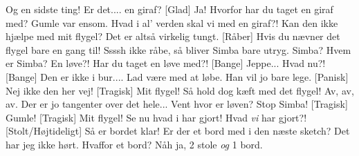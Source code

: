 \documentclass[a4paper,11pt]{article}
\begin{document}
\begin{sketch}
 Og en sidste ting!  Er det.... en giraf?
[Glad] Ja!
 Hvorfor har du taget en giraf med?
 Gumle var ensom.
 Hvad i al' verden skal vi med en giraf?! 
 Kan den ikke hjælpe med mit flygel? Det er altså virkelig tungt.
[Råber] Hvis du nævner det flygel bare en gang til!
 Ssssh ikke råbe, så bliver Simba bare utryg.
 Simba? Hvem er Simba?
 En løve?! Har du taget en løve med?!
[Bange] Jeppe...
 Hvad nu?!
[Bange] Den er ikke i bur....
 
 Lad være med at løbe. Han vil jo bare lege.
 
[Panisk] Nej ikke den her vej!
[Tragisk] Mit flygel!
 Så hold dog kæft med det flygel! 
 Av, av, av. Der er jo tangenter over det hele... Vent hvor er løven?
 Stop Simba!
[Tragisk] Gumle! 
[Tragisk] Mit flygel! 
 Se nu hvad i har gjort!
 Hvad \emph{vi} har gjort?! 
[Stolt/Højtideligt] Så er bordet klar!
 Er der et bord med i den næste sketch?
 Det har jeg ikke hørt.
 Hvaffor et bord?
 Nåh ja, 2 stole \emph{og} 1 bord.







\end{sketch}
\end{document}
